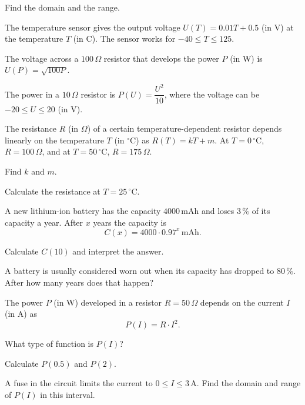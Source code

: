 Find the domain and the range.
\begin{parts}
  \item The temperature sensor  gives the output voltage $U(T) = 0.01T + 0.5$ (in V) at
    the temperature $T$ (in \textdegree C). The sensor works for $-40 \leq T \leq 125$.
  \item The voltage across a $100\,\Omega$ resistor that develops the power $P$ (in W) is $U(P) =
    \sqrt{100P}$.
  \item The power in a $10\,\Omega$ resistor is $P(U) = \dfrac{U^2}{10}$, where the voltage can be
    $-20 \leq U \leq 20$ (in V).
\end{parts}

The resistance $R$ (in $\Omega$) of a certain temperature-dependent resistor depends linearly on
the temperature $T$ (in $^{\circ}$C) as $R(T) = kT + m$. At $T = 0\,^{\circ}\text{C}$,
$R = 100\,\Omega$, and at $T = 50\,^{\circ}\text{C}$, $R = 175\,\Omega$.
\begin{parts}
  \item Find $k$ and $m$.
  \item Calculate the resistance at $T = 25\,^{\circ}\text{C}$.
\end{parts}

A new lithium-ion battery has the capacity $4000\,\text{mAh}$ and loses $3\,\%$ of its capacity a
year. After $x$ years the capacity is
\[
  C(x) = 4000 \cdot 0.97^x\,\text{mAh}.
\]
\begin{parts}
  \item Calculate $C(10)$ and interpret the answer.
  \item A battery is usually considered worn out when its capacity has dropped to $80\,\%$. After how
    many years does that happen?
\end{parts}

The power $P$ (in W) developed in a resistor $R = 50\,\Omega$ depends on the current $I$ (in A)
as
\[
  P(I) = R \cdot I^2.
\]
\begin{parts}
  \item What type of function is $P(I)$?
  \item Calculate $P(0.5)$ and $P(2)$.
  \item A fuse in the circuit limits the current to $0 \leq I \leq 3\,\text{A}$. Find the domain
    and range of $P(I)$ in this interval.
\end{parts}

